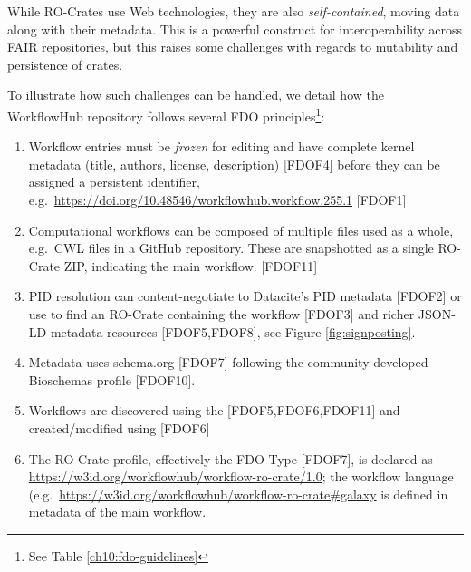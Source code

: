 While RO-Crates use Web technologies, they are also
\emph{self-contained}, moving data along with their metadata. This is a
powerful construct for interoperability across FAIR repositories, but
this raises some challenges with regards to mutability and persistence
of crates.

To illustrate how such challenges can be handled, we detail how the
WorkflowHub repository follows several FDO principles\footnote{
  See Table \vref{ch10:fdo-guidelines}
}:

\begin{enumerate}

\item
  Workflow entries must be \emph{frozen} for editing and have complete
  kernel metadata (title, authors, license, description) {[}FDOF4{]}
  before they can be assigned a persistent identifier,
  e.g.~\url{https://doi.org/10.48546/workflowhub.workflow.255.1}
  {[}FDOF1{]}
\item
  Computational workflows can be composed of multiple files used as a
  whole, e.g.~CWL files in a GitHub repository. These are snapshotted as
  a single RO-Crate ZIP, indicating the main workflow. {[}FDOF11{]}
\item
  PID resolution can content-negotiate to Datacite's PID metadata
  {[}FDOF2{]} or use  to find an RO-Crate containing the workflow {[}FDOF3{]}
  and richer JSON-LD metadata resources {[}FDOF5,FDOF8{]}, see
  Figure \vref{fig:signposting}.
\item
  Metadata uses schema.org {[}FDOF7{]} following the community-developed
  Bioschemas
  profile {[}FDOF10{]}.
\item
  Workflows are discovered using
  the
  {[}FDOF5,FDOF6,FDOF11{]} and created/modified using
   {[}FDOF6{]}
\item
  The RO-Crate profile, effectively the FDO Type {[}FDOF7{]}, is
  declared as \url{https://w3id.org/workflowhub/workflow-ro-crate/1.0};
  the workflow language
  (e.g.~\url{https://w3id.org/workflowhub/workflow-ro-crate\#galaxy} is
  defined in metadata of the main workflow.
\end{enumerate}



